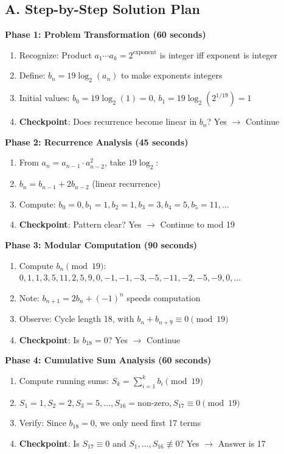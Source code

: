 \documentclass[11pt]{article}
\begin{document}
\begin{roadmapbox}
\subsection*{A. Step-by-Step Solution Plan}

\textbf{Phase 1: Problem Transformation (60 seconds)}
\begin{enumerate}[leftmargin=*]
    \item Recognize: Product $a_1 \cdots a_k = 2^{\text{exponent}}$ is integer iff exponent is integer
    \item Define: $b_n = 19\log_2(a_n)$ to make exponents integers
    \item Initial values: $b_0 = 19\log_2(1) = 0$, $b_1 = 19\log_2(2^{1/19}) = 1$
    \item \textbf{Checkpoint}: Does recurrence become linear in $b_n$? Yes $\rightarrow$ Continue
\end{enumerate}

\textbf{Phase 2: Recurrence Analysis (45 seconds)}
\begin{enumerate}[leftmargin=*]
    \item From $a_n = a_{n-1} \cdot a_{n-2}^2$, take $19\log_2$:
    \item $b_n = b_{n-1} + 2b_{n-2}$ (linear recurrence)
    \item Compute: $b_0=0, b_1=1, b_2=1, b_3=3, b_4=5, b_5=11, \ldots$
    \item \textbf{Checkpoint}: Pattern clear? Yes $\rightarrow$ Continue to mod 19
\end{enumerate}

\textbf{Phase 3: Modular Computation (90 seconds)}
\begin{enumerate}[leftmargin=*]
    \item Compute $b_n \pmod{19}$: $0, 1, 1, 3, 5, 11, 2, 5, 9, 0, -1, -1, -3, -5, -11, -2, -5, -9, 0, \ldots$
    \item Note: $b_{n+1} = 2b_n + (-1)^n$ speeds computation
    \item Observe: Cycle length 18, with $b_n + b_{n+9} \equiv 0 \pmod{19}$
    \item \textbf{Checkpoint}: Is $b_{18} = 0$? Yes $\rightarrow$ Continue
\end{enumerate}

\textbf{Phase 4: Cumulative Sum Analysis (60 seconds)}
\begin{enumerate}[leftmargin=*]
    \item Compute running sums: $S_k = \sum_{i=1}^{k} b_i \pmod{19}$
    \item $S_1=1, S_2=2, S_3=5, \ldots, S_{16}=\text{non-zero}, S_{17} \equiv 0 \pmod{19}$
    \item Verify: Since $b_{18}=0$, we only need first 17 terms
    \item \textbf{Checkpoint}: Is $S_{17} \equiv 0$ and $S_1, \ldots, S_{16} \not\equiv 0$? Yes $\rightarrow$ Answer is 17
\end{enumerate}


\end{roadmapbox}
\end{document}
